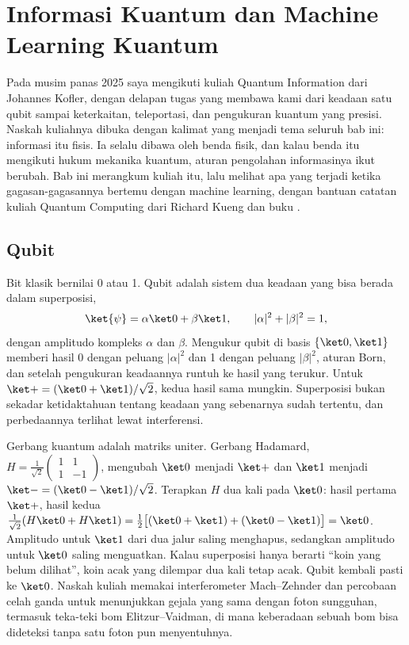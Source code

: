 \chapter{Informasi Kuantum dan Machine Learning Kuantum}
\label{ch:kuantum}

Pada musim panas 2025 saya mengikuti kuliah Quantum Information dari Johannes Kofler, dengan delapan tugas yang membawa kami dari
keadaan satu qubit sampai keterkaitan, teleportasi, dan pengukuran kuantum yang presisi. Naskah kuliahnya dibuka dengan kalimat
yang menjadi tema seluruh bab ini: informasi itu fisis. Ia selalu dibawa oleh benda fisik, dan kalau benda itu mengikuti hukum
mekanika kuantum, aturan pengolahan informasinya ikut berubah. Bab ini merangkum kuliah itu, lalu melihat apa yang terjadi ketika
gagasan-gagasannya bertemu dengan machine learning, dengan bantuan catatan kuliah Quantum Computing dari Richard Kueng dan buku
\citet{schuld2021}.

\section{Qubit}

Bit klasik bernilai 0 atau 1. Qubit adalah sistem dua keadaan yang bisa berada dalam superposisi,
\begin{equation}
\ket{\psi}=\alpha\ket0+\beta\ket1,\qquad |\alpha|^2+|\beta|^2=1,
\end{equation}
dengan amplitudo kompleks $\alpha$ dan $\beta$. Mengukur qubit di basis $\{\ket0,\ket1\}$ memberi hasil 0 dengan peluang $|\alpha|^2$ dan
1 dengan peluang $|\beta|^2$, aturan Born, dan setelah pengukuran keadaannya runtuh ke hasil yang terukur. Untuk
$\ket+=(\ket0+\ket1)/\sqrt2$, kedua hasil sama mungkin. Superposisi bukan sekadar ketidaktahuan tentang keadaan yang sebenarnya
sudah tertentu, dan perbedaannya terlihat lewat interferensi.

Gerbang kuantum adalah matriks uniter. Gerbang Hadamard,
$H=\tfrac1{\sqrt2}\begin{pmatrix}1&1\\1&-1\end{pmatrix}$, mengubah $\ket0$ menjadi $\ket+$ dan $\ket1$ menjadi
$\ket-=(\ket0-\ket1)/\sqrt2$. Terapkan $H$ dua kali pada $\ket0$: hasil pertama $\ket+$, hasil kedua
$\tfrac1{\sqrt2}(H\ket0+H\ket1)=\tfrac12\big[(\ket0+\ket1)+(\ket0-\ket1)\big]=\ket0$. Amplitudo untuk $\ket1$ dari dua jalur saling
menghapus, sedangkan amplitudo untuk $\ket0$ saling menguatkan. Kalau superposisi hanya berarti ``koin yang belum dilihat'', koin
acak yang dilempar dua kali tetap acak. Qubit kembali pasti ke $\ket0$. Naskah kuliah memakai interferometer Mach--Zehnder dan
percobaan celah ganda untuk menunjukkan gejala yang sama dengan foton sungguhan, termasuk teka-teki bom Elitzur--Vaidman, di
mana keberadaan sebuah bom bisa dideteksi tanpa satu foton pun menyentuhnya.


